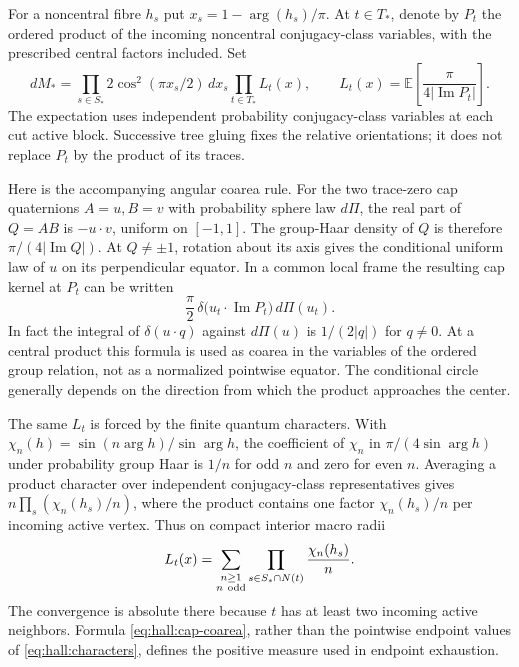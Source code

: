 For a noncentral fibre \(h_s\) put \(x_s=1-\arg(h_s)/\pi\).
At \(t\in T_*\), denote by \(P_t\) the ordered product of the incoming
noncentral conjugacy-class variables, with the prescribed central
factors included. Set
\begin{equation}
 dM_*=\prod_{s\in S_*}2\cos^2(\pi x_s/2)\,dx_s\prod_{t\in T_*} L_t(x),
 \qquad
 L_t(x)=\mathbb E\!\left[\frac{\pi}{4|\operatorname{Im}P_t|}\right].
 \label{eq:hall:weight}
\end{equation}
The expectation uses independent probability conjugacy-class variables at
each cut active block. Successive tree gluing fixes the relative
orientations; it does not replace \(P_t\) by the product of its traces.

Here is the accompanying angular coarea rule. For the two trace-zero
cap quaternions \(A=u,B=v\) with probability sphere law \(d\Pi\), the
real part of \(Q=AB\) is \(-u\cdot v\), uniform on \([-1,1]\).
The group-Haar density of \(Q\) is therefore
\(\pi/(4|\operatorname{Im}Q|)\). At \(Q\ne\pm1\), rotation about its
axis gives the conditional uniform law of \(u\) on its perpendicular
equator. In a common local frame the resulting cap kernel at \(P_t\)
can be written
\begin{equation}
              \frac{\pi}{2}\,
          \delta\bigl(u_t\cdot\operatorname{Im}P_t\bigr)\,d\Pi(u_t).
 \label{eq:hall:cap-coarea}
\end{equation}
In fact the integral of \(\delta(u\cdot q)\) against \(d\Pi(u)\) is
\(1/(2|q|)\) for \(q\ne0\). At a central product this formula is used as
coarea in the variables of the ordered group relation, not as a
normalized pointwise equator. The conditional circle generally depends
on the direction from which the product approaches the center.

The same \(L_t\) is forced by the finite quantum characters. With
\(\chi_n(h)=\sin(n\arg h)/\sin\arg h\), the coefficient of \(\chi_n\) in
\(\pi/(4\sin\arg h)\) under probability group Haar is \(1/n\) for odd \(n\)
and zero for even \(n\). Averaging a product character over independent
conjugacy-class representatives gives
\(n\prod_s(\chi_n(h_s)/n)\), where the product contains one factor
\(\chi_n(h_s)/n\) per incoming active vertex. Thus on compact interior
macro radii
\begin{equation}
 L_t(x)=\sum_{\substack{n\ge1\\ n\ {\rm odd}}}
             \prod_{s\in S_*\cap N(t)}\frac{\chi_n(h_s)}n .
 \label{eq:hall:characters}
\end{equation}
The convergence is absolute there because \(t\) has at least two incoming
active neighbors. Formula \eqref{eq:hall:cap-coarea}, rather than the
pointwise endpoint values of \eqref{eq:hall:characters}, defines the
positive measure used in endpoint exhaustion.

